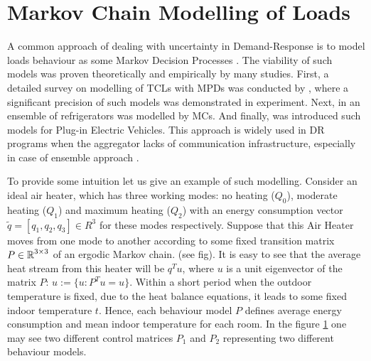 \section{Markov Chain Modelling of Loads}
\label{section:markov_devices}


A common approach of dealing with uncertainty in Demand-Response is to model loads behaviour as some Markov Decision Processes . The viability of such models was proven theoretically and empirically by many studies. First, a detailed survey on modelling of TCLs with MPDs was conducted by \cite{Koch2011}, where a significant precision of such models was demonstrated in experiment. Next, in \cite{Trovato2015} an ensemble of refrigerators was modelled by MCs. And finally, \cite{Wu2016} was introduced such models for Plug-in Electric Vehicles. This approach is widely used in DR programs when the aggregator lacks of communication infrastructure, especially in case of ensemble approach \cite{Chertkov2017}. 

To provide some intuition let us give an example of such modelling. Consider an ideal air heater, which has three working modes: no heating ($Q_0$), moderate heating ($Q_1$) and maximum heating ($Q_2$) with an energy consumption vector $\widetilde{q} = [q_1, q_2, q_3] \in R^3$ for these modes respectively. Suppose that this Air Heater moves from one mode to another according to some fixed transition matrix $P \in \operatorname{\mathbb{R}}^{3 \times 3}$ of an ergodic Markov chain. (see fig). It is easy to see that the average heat stream from this heater will be $q^Tu$, where $u$ is a unit eigenvector of the matrix $P$: $u := \{u : P^Tu = u\}$. Within a short period when the outdoor temperature is fixed, due to the heat balance equations, it leads to some fixed indoor temperature $t$. Hence, each behaviour model $P$ defines average energy consumption and mean indoor temperature for each room. In the figure \ref{fig:matrices_example} one may see two different control matrices $P_1$ and $P_2$ representing two different behaviour models. 

\begin{figure}
    \centering
    \label{fig:matrices_example}
\end{figure} 